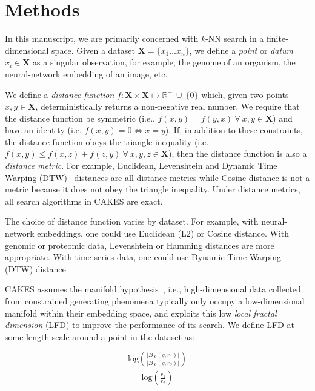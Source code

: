 \section{Methods}
\label{sec:methods}

In this manuscript, we are primarily concerned with $k$-NN search in a finite-dimensional space.
Given a dataset $\textbf{X} = \{x_1 \dots x_n\}$, we define a \emph{point} or \emph{datum} $x_i \in \textbf{X}$ as a singular observation, for example, the genome of an organism, the neural-network embedding of an image, etc.

We define a \emph{distance function} $f : \textbf{X} \times \textbf{X} \mapsto \mathbb{R}^+ \ \cup \ \{0\}$ which, given two points $x, y \in \textbf{X}$, deterministically returns a non-negative real number.
We require that the distance function be symmetric (i.e., $f(x, y) = f(y, x) \ \forall \ x, y \in \textbf{X}$) and have an identity (i.e. $f(x, y) = 0 \iff x = y$).
If, in addition to these constraints, the distance function obeys the triangle inequality (i.e. $f(x, y) \leq f(x, z) + f(z, y) \ \forall \ x, y, z \in \textbf{X}$), then the distance function is also a \emph{distance metric}.
For example, Euclidean, Levenshtein and Dynamic Time Warping (DTW)~\cite{muller2007dynamic} distances are all distance metrics while Cosine distance is not a metric because it does not obey the triangle inequality.
Under distance metrics, all search algorithms in CAKES are exact.

The choice of distance function varies by dataset.
For example, with neural-network embeddings, one could use Euclidean (L2) or Cosine distance.
With genomic or proteomic data, Levenshtein or Hamming distances are more appropriate.
With time-series data, one could use Dynamic Time Warping (DTW) distance.

CAKES assumes the manifold hypothesis~\cite{fefferman2016testing}, i.e., high-dimensional data collected from constrained generating phenomena typically only occupy a low-dimensional manifold within their embedding space, and exploits this low \emph{local fractal dimension} (LFD) to improve the performance of its search.
We define LFD at some length scale around a point in the dataset as:

\begin{equation}
    \frac{\text{log} \left( \frac{|B_X(q, r_1)|}{|B_X(q, r_2)|} \right) }{\text{log} \left( \frac{r_1}{r_2} \right) }
    \label{eq:methods:lfd-original}
\end{equation}

